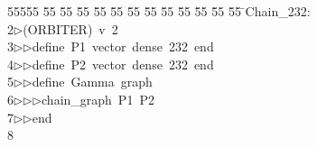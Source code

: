 %
%
\begin{tabbing}
55555 \= 55 \= 55 \= 55 \= 55 \= 55 \= 55 \= 55 \= 55 \= 55 \= 55 \= 55 \= 55 \= \>Chain\_232:\\[0pt]
2\>$\triangleright$\>(ORBITER)\ v\ 2\ \\[0pt]
3\>$\triangleright$\>$\triangleright$\>define\ P1\ vector\ dense\ 232\ end\ \\[0pt]
4\>$\triangleright$\>$\triangleright$\>define\ P2\ vector\ dense\ 232\ end\ \\[0pt]
5\>$\triangleright$\>$\triangleright$\>define\ Gamma\ graph\ \\[0pt]
6\>$\triangleright$\>$\triangleright$\>$\triangleright$\>chain\_graph\ P1\ P2\ \\[0pt]
7\>$\triangleright$\>$\triangleright$\>end\\[0pt]
8\>\end{tabbing}
